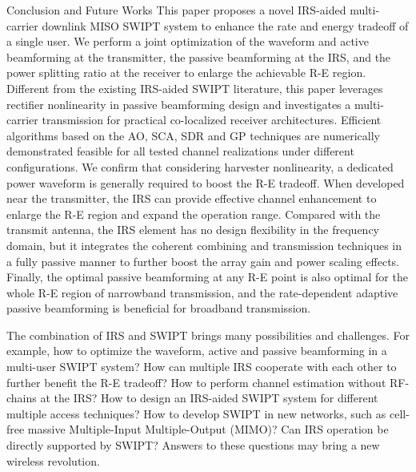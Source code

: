 \documentclass[journal]{IEEEtran}
\begin{document}
	\begin{section}{Conclusion and Future Works}\label{se:conclusion_and_future_works}
		This paper proposes a novel IRS-aided multi-carrier downlink MISO SWIPT system to enhance the rate and energy tradeoff of a single user. We perform a joint optimization of the waveform and active beamforming at the transmitter, the passive beamforming at the IRS, and the power splitting ratio at the receiver to enlarge the achievable R-E region. Different from the existing IRS-aided SWIPT literature, this paper leverages rectifier nonlinearity in passive beamforming design and investigates a multi-carrier transmission for practical co-localized receiver architectures. Efficient algorithms based on the AO, SCA, SDR and GP techniques are numerically demonstrated feasible for all tested channel realizations under different configurations. We confirm that considering harvester nonlinearity, a dedicated power waveform is generally required to boost the R-E tradeoff. When developed near the transmitter, the IRS can provide effective channel enhancement to enlarge the R-E region and expand the operation range. Compared with the transmit antenna, the IRS element has no design flexibility in the frequency domain, but it integrates the coherent combining and transmission techniques in a fully passive manner to further boost the array gain and power scaling effects. Finally, the optimal passive beamforming at any R-E point is also optimal for the whole R-E region of narrowband transmission, and the rate-dependent adaptive passive beamforming is beneficial for broadband transmission.

		The combination of IRS and SWIPT brings many possibilities and challenges. For example, how to optimize the waveform, active and passive beamforming in a multi-user SWIPT system? How can multiple IRS cooperate with each other to further benefit the R-E tradeoff? How to perform channel estimation without RF-chains at the IRS? How to design an IRS-aided SWIPT system for different multiple access techniques? How to develop SWIPT in new networks, such as cell-free massive Multiple-Input Multiple-Output (MIMO)? Can IRS operation be directly supported by SWIPT? Answers to these questions may bring a new wireless revolution.
	\end{section}


	
	
\end{document}

